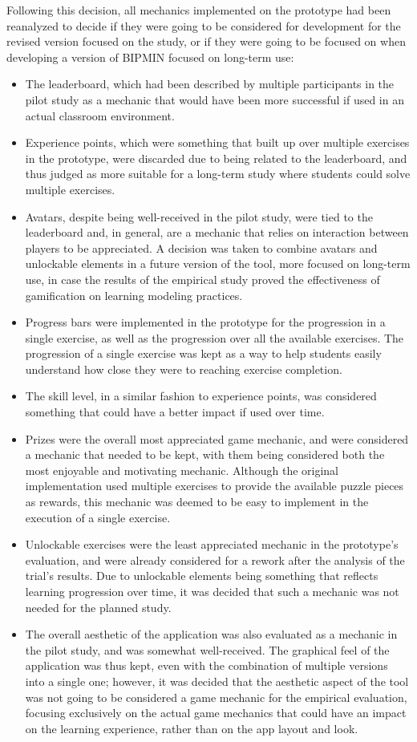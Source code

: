 Following this decision, all mechanics implemented on the prototype had been reanalyzed to decide if they were going to be considered for development for the revised version focused on the study, or if they were going to be focused on when developing a version of BIPMIN focused on long-term use:
\begin{itemize}
    \item The leaderboard, which had been described by multiple participants in the pilot study as a mechanic that would have been more successful if used in an actual classroom environment.
    \item Experience points, which were something that built up over multiple exercises in the prototype, were discarded due to being related to the leaderboard, and thus judged as more suitable for a long-term study where students could solve multiple exercises.
    \item Avatars, despite being well-received in the pilot study, were tied to the leaderboard and, in general, are a mechanic that relies on interaction between players to be appreciated. A decision was taken to combine avatars and unlockable elements in a future version of the tool, more focused on long-term use, in case the results of the empirical study proved the effectiveness of gamification on learning modeling practices. 
    \item Progress bars were implemented in the prototype for the progression in a single exercise, as well as the progression over all the available exercises. The progression of a single exercise was kept as a way to help students easily understand how close they were to reaching exercise completion.
    \item The skill level, in a similar fashion to experience points, was considered something that could have a better impact if used over time.
    \item Prizes were the overall most appreciated game mechanic, and were considered a mechanic that needed to be kept, with them being considered both the most enjoyable and motivating mechanic. Although the original implementation used multiple exercises to provide the available puzzle pieces as rewards, this mechanic was deemed to be easy to implement in the execution of a single exercise.
    \item Unlockable exercises were the least appreciated mechanic in the prototype's evaluation, and were already considered for a rework after the analysis of the trial's results. Due to unlockable elements being something that reflects learning progression over time, it was decided that such a mechanic was not needed for the planned study.
    \item The overall aesthetic of the application was also evaluated as a mechanic in the pilot study, and was somewhat well-received. The graphical feel of the application was thus kept, even with the combination of multiple versions into a single one; however, it was decided that the aesthetic aspect of the tool was not going to be considered a game mechanic for the empirical evaluation, focusing exclusively on the actual game mechanics that could have an impact on the learning experience, rather than on the app layout and look.  
\end{itemize}

